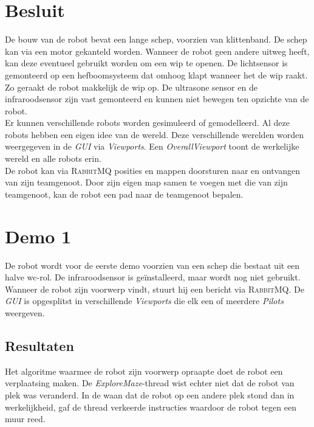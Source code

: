 \documentclass[eind]{penoverslag}
\begin{document}
\section{Besluit}
\label{sec:Besluit}
De bouw van de robot bevat een lange schep, voorzien van klittenband. De schep kan via een motor gekanteld worden. Wanneer de robot geen andere uitweg heeft, kan deze eventueel gebruikt worden om een wip te openen. De lichtsensor is gemonteerd op een hefboomsysteem dat omhoog klapt wanneer het de wip raakt. Zo geraakt de robot makkelijk de wip op. De ultrasone sensor en de infraroodsensor zijn vast gemonteerd en kunnen niet bewegen ten opzichte van de robot.\\

Er kunnen verschillende robots worden gesimuleerd of gemodelleerd. Al deze robots hebben een eigen idee van de wereld. Deze verschillende werelden worden weergegeven in de \textit{GUI} via \textit{Viewports}. Een \textit{OverallViewport} toont de werkelijke wereld en alle robots erin.\\

De robot kan via \textsc{RabbitMQ} posities en mappen doorsturen naar en ontvangen van zijn teamgenoot. Door zijn eigen map samen te voegen met die van zijn teamgenoot, kan de robot een pad naar de teamgenoot bepalen.


\newpage
\makeappendix

\section{Demo 1}
\label{Asec:demo1}
De robot wordt voor de eerste demo voorzien van een schep die bestaat uit een halve wc-rol. De infraroodsensor is ge\"installeerd, maar wordt nog niet gebruikt. Wanneer de robot zijn voorwerp vindt, stuurt hij een bericht via \textsc{RabbitMQ}. De \textit{GUI} is opgesplitst in verschillende \textit{Viewports} die elk een of meerdere \textit{Pilots} weergeven.

\subsection{Resultaten}
\label{Assec:result1}
Het algoritme waarmee de robot zijn voorwerp opraapte doet de robot een verplaatsing maken. De \textit{ExploreMaze}-thread wist echter niet dat de robot van plek was veranderd. In de waan dat de robot op een andere plek stond dan in werkelijkheid, gaf de thread verkeerde instructies waardoor de robot tegen een muur reed.
\end{document}
